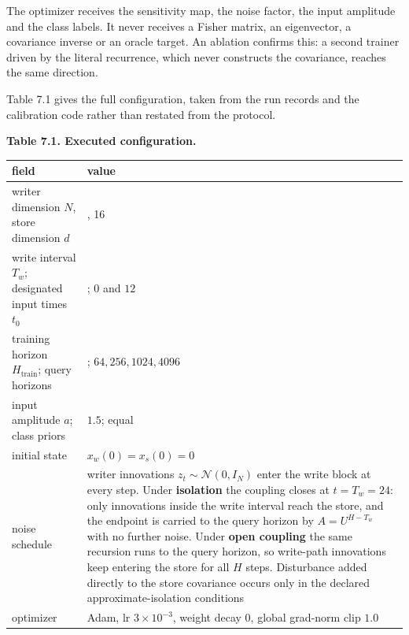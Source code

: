 \documentclass[
  10pt,
]{article}
\newcounter{none} %
\begin{document}
The optimizer receives the sensitivity map, the noise factor, the input
amplitude and the class labels. It never receives a Fisher matrix, an
eigenvector, a covariance inverse or an oracle target. An ablation
confirms this: a second trainer driven by the literal recurrence, which
never constructs the covariance, reaches the same direction.

Table 7.1 gives the full configuration, taken from the run records and
the calibration code rather than restated from the protocol.

\textbf{Table 7.1. Executed configuration.}

{\def\LTcaptype{none} %
\begin{longtable}[]{@{}
  >{\raggedright\arraybackslash}p{}
  >{\raggedright\arraybackslash}p{}@{}}
\toprule\noalign{}
\begin{minipage}[b]{\linewidth}\raggedright
field
\end{minipage} & \begin{minipage}[b]{\linewidth}\raggedright
value
\end{minipage} \\
\midrule\noalign{}
\endhead
\bottomrule\noalign{}
\endlastfoot
writer dimension \(N\), store dimension \(d\) & 32, 16 \\
write interval \(T_w\); designated input times \(t_0\) & 24; \(0\) and
\(12\) \\
training horizon \(H_{\text{train}}\); query horizons & 128;
\(64,256,1024,4096\) \\
input amplitude \(a\); class priors & \(1.5\); equal \\
initial state & \(x_w(0)=x_s(0)=0\) \\
noise schedule & writer innovations \(z_t\sim\mathcal N(0,I_N)\) enter
the write block at every step. Under \textbf{isolation} the coupling
closes at \(t=T_w=24\): only innovations inside the write interval reach
the store, and the endpoint is carried to the query horizon by
\(A=U^{H-T_w}\) with no further noise. Under \textbf{open coupling} the
same recursion runs to the query horizon, so write-path innovations keep
entering the store for all \(H\) steps. Disturbance added directly to
the store covariance occurs only in the declared approximate-isolation
conditions \\
optimizer & Adam, lr \(3\times10^{-3}\), weight decay \(0\), global
grad-norm clip \(1.0\) \\

\end{longtable}}
\end{document}
